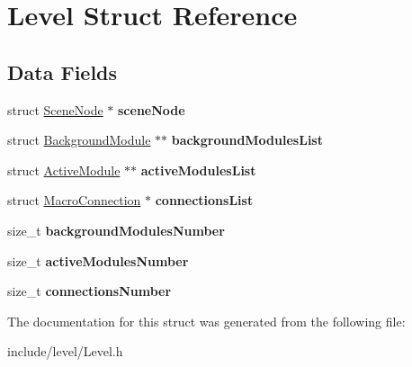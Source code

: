 \hypertarget{struct_level}{}\section{Level Struct Reference}
\label{struct_level}
\subsection*{Data Fields}
\begin{DoxyCompactItemize}
\item 
\hypertarget{struct_level_a423738fbe912b45f31f4d80af3aa244a}{}\label{struct_level_a423738fbe912b45f31f4d80af3aa244a} 
struct \hyperlink{struct_scene_node}{Scene\+Node} $\ast$ {\bfseries scene\+Node}
\item 
\hypertarget{struct_level_a4591cd1e32070b046cf1c44d018f828f}{}\label{struct_level_a4591cd1e32070b046cf1c44d018f828f} 
struct \hyperlink{struct_background_module}{Background\+Module} $\ast$$\ast$ {\bfseries background\+Modules\+List}
\item 
\hypertarget{struct_level_a1e6247e011e52d3b0897bbfb3dc18d94}{}\label{struct_level_a1e6247e011e52d3b0897bbfb3dc18d94} 
struct \hyperlink{struct_active_module}{Active\+Module} $\ast$$\ast$ {\bfseries active\+Modules\+List}
\item 
\hypertarget{struct_level_aeeaa868210d615b28c642d00537c2416}{}\label{struct_level_aeeaa868210d615b28c642d00537c2416} 
struct \hyperlink{struct_macro_connection}{Macro\+Connection} $\ast$ {\bfseries connections\+List}
\item 
\hypertarget{struct_level_a03a62cbf5839395bbe96e4285d8e5ecb}{}\label{struct_level_a03a62cbf5839395bbe96e4285d8e5ecb} 
size\+\_\+t {\bfseries background\+Modules\+Number}
\item 
\hypertarget{struct_level_a5e35b64f3662f78597c212c97f5a169d}{}\label{struct_level_a5e35b64f3662f78597c212c97f5a169d} 
size\+\_\+t {\bfseries active\+Modules\+Number}
\item 
\hypertarget{struct_level_a0fada452902e3dc14c786de8d1cb5ed5}{}\label{struct_level_a0fada452902e3dc14c786de8d1cb5ed5} 
size\+\_\+t {\bfseries connections\+Number}
\end{DoxyCompactItemize}


The documentation for this struct was generated from the following file\+:\begin{DoxyCompactItemize}
\item 
include/level/Level.\+h\end{DoxyCompactItemize}
